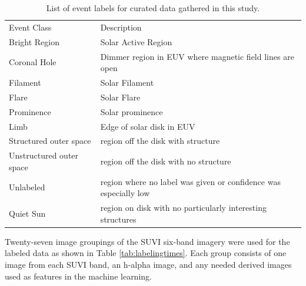 \documentclass[twoside]{report}
\begin{document}
\begin{table}[ht!]
  \centering
  \begin{tabular}{||p{4cm} p{10cm}||}
    \hline
    Event Class & Description \\
    Bright Region & Solar Active Region\\
    Coronal Hole & Dimmer region in EUV where magnetic field lines are open\\
    Filament & Solar Filament \\
    Flare & Solar Flare \\
    Prominence & Solar prominence \\
    Limb & Edge of solar disk in EUV \\
    Structured outer space & region off the disk with structure \\
    Unstructured outer space & region off the disk with no structure \\
    Unlabeled & region where no label was given or confidence was especially low \\
    Quiet Sun & region on disk with no particularly interesting structures \\
    \hline             
  \end{tabular}
  \caption{List of event labels for curated data gathered in this study.}
  \label{tab:mylabels}
\end{table}

Twenty-seven image groupings of the SUVI six-band imagery were used for the labeled data as shown in Table \ref{tab:labelingtimes}. Each group consists of one image from each SUVI band, an h-alpha image, and any needed derived images used as features in the machine learning.
\end{document}
